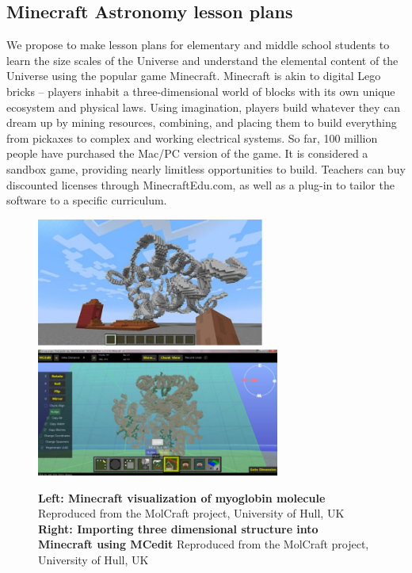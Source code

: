 \subsection{Minecraft Astronomy lesson plans}




We propose to make lesson plans for elementary and middle school students to 
learn the size scales of the Universe and understand the elemental content 
of the Universe using the popular game Minecraft. 
Minecraft is akin to digital Lego bricks – players inhabit a 
three-dimensional 
world of blocks with its own unique ecosystem and physical laws. Using 
imagination, 
players build whatever they can dream up by mining resources, combining, 
and placing them to build everything from pickaxes 
to complex and working electrical systems. So far, 100 million people have 
purchased 
the Mac/PC version of the game. 
It is considered a sandbox game, providing nearly limitless opportunities 
to  build. Teachers can buy discounted licenses through MinecraftEdu.com, as 
well as a plug-in to tailor the software to a specific curriculum. 



\begin{figure}%
\centering
\includegraphics[width=75mm]{figs/myoglobin.jpg}
\includegraphics[width=80mm]{figs/mcedit.jpg}
\caption{\footnotesize{{\bf Left:
Minecraft visualization of myoglobin molecule} 
Reproduced from the MolCraft project, University of Hull, UK
{\bf Right: Importing three dimensional structure into Minecraft
using MCedit} Reproduced from the MolCraft project, University of Hull, UK
}}
\label{molcraft}
\end{figure}


